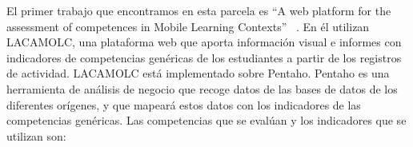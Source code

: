 
El primer trabajo que encontramos en esta parcela es “A web platform for the assessment of competences in Mobile Learning Contexts” ~\cite{rayon2014web}. En él utilizan LACAMOLC, una plataforma web que aporta información visual e informes con indicadores de competencias genéricas de los estudiantes a partir de los registros de actividad. LACAMOLC está implementado sobre Pentaho. Pentaho es una herramienta de análisis de negocio que recoge datos de las bases de datos de los diferentes orígenes, y que mapeará estos datos con los indicadores de las competencias genéricas. Las competencias que se evalúan y los indicadores que se utilizan son:

